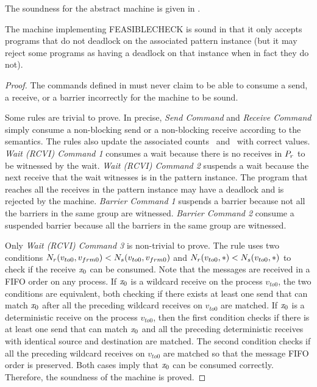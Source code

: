 The soundness for the abstract machine is given in .

\begin{lemma}
  The machine implementing \textrm{FEASIBLECHECK} is sound in that it
  only accepts programs that do not deadlock on the associated pattern
  instance (but it may reject some programs as having a deadlock on
  that instance when in fact they do not).
\label{lemma:sound}
\end{lemma}
\begin{proof}
The commands defined in  must never claim to be able to consume a send, a receive, or a barrier incorrectly for the machine to be sound.

Some rules are trivial to prove. In precise, \emph{Send Command} and \emph{Receive Command} simply consume a non-blocking send or a non-blocking receive according to the semantics. The rules also update the associated counts \epsnd\ and \epwait\ with correct values. \emph{Wait (RCVI) Command 1} consumes a wait because there is no receives in $\textit{$P_r$}$ to be witnessed by the wait. \emph{Wait (RCVI) Command 2} suspends a wait because the next receive that the wait witnesses is in the pattern instance. The program that reaches all the receives in the pattern instance may have a deadlock and is rejected by the machine. \emph{Barrier Command 1} suspends a barrier because not all the barriers in the same group are witnessed. \emph{Barrier Command 2} consume a suspended barrier because all the barriers in the same group are witnessed.

  Only \emph{Wait (RCVI) Command 3} is non-trivial to prove. The rule uses two conditions 
  $\textit{$N_r$}(v_{to0},v_{frm0}) < \textit{$N_s$}(v_{to0},v_{frm0})$
and 
$\textit{$N_r$}(v_{to0},\ast) < \textit{$N_s$}(v_{to0},\ast)$
to check if the receive $\mathit{x}_0$ can be consumed. Note that the messages are received in a FIFO order on any process. If $\mathit{x}_0$ is a wildcard receive on the process $v_{to0}$, the two conditions are equivalent, both checking if there exists at least one send that can match $\mathit{x}_0$ after all the preceding wildcard receives on $v_{to0}$ are matched. 
If $\mathit{x}_0$ is a deterministic receive on the process $v_{to0}$, then the first condition checks if there is at least one send that can match $\mathit{x}_0$ and all the preceding deterministic receives with identical source and destination are matched. The second condition checks if all the preceding wildcard receives on $v_{to0}$ are matched so that the message FIFO order is preserved. Both cases imply that $\mathit{x}_0$ can be consumed correctly. Therefore, the soundness of the machine is proved.  
\end{proof}

